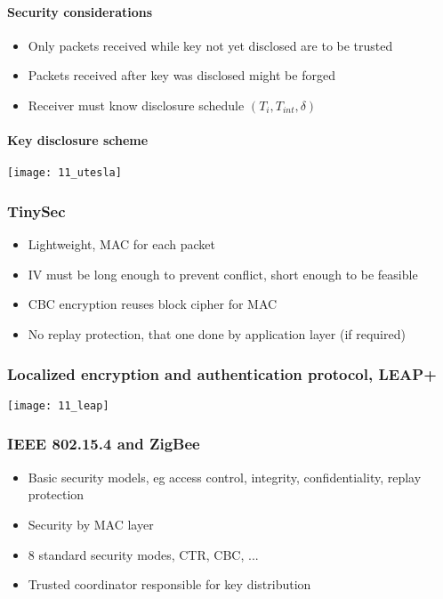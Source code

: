 \paragraph{Security considerations}

\begin{itemize}
		\item Only packets received while key not yet disclosed are to be trusted
		\item Packets received after key was disclosed might be forged
		\item Receiver must know disclosure schedule $(T_i, T_{int}, \delta)$
\end{itemize}

\paragraph{Key disclosure scheme}

\texttt{[image: 11\_utesla]}

\subsubsection{TinySec}

\begin{itemize}
		\item Lightweight, MAC for each packet
		\item IV must be long enough to prevent conflict, short enough to be feasible
		\item CBC encryption reuses block cipher for MAC
		\item No replay protection, that one done by application layer (if required)
\end{itemize}

\subsubsection{Localized encryption and authentication protocol, LEAP+}

\texttt{[image: 11\_leap]}

\subsubsection{IEEE 802.15.4 and ZigBee}

\begin{itemize}
		\item Basic security models, eg access control, integrity, confidentiality, replay protection
		\item Security by MAC layer
		\item 8 standard security modes, CTR, CBC, ...
		\item Trusted coordinator responsible for key distribution
\end{itemize}

